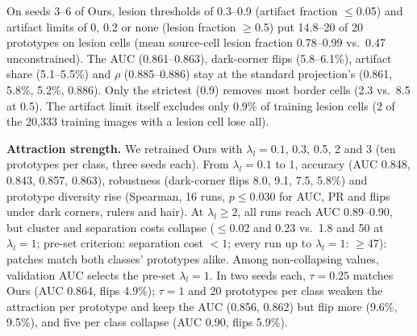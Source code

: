 \documentclass[conference]{IEEEtran}
\begin{document}
On seeds 3--6 of Ours, lesion thresholds of 0.3--0.9 (artifact fraction $\leq$0.05) and artifact limits of 0, 0.2 or none (lesion fraction $\geq$0.5) put 14.8--20 of 20 prototypes on lesion cells (mean source-cell lesion fraction 0.78--0.99 vs.\ 0.47 unconstrained). The AUC (0.861--0.863), dark-corner flips (5.8--6.1\%), artifact share (5.1--5.5\%) and $\rho$ (0.885--0.886) stay at the standard projection's (0.861, 5.8\%, 5.2\%, 0.886). Only the strictest (0.9) removes most border cells (2.3 vs.\ 8.5 at 0.5). The artifact limit itself excludes only 0.9\% of training lesion cells (2 of the 20{,}333 training images with a lesion cell lose all).

\textbf{Attraction strength.} We retrained Ours with $\lambda_l=0.1$, 0.3, 0.5, 2 and 3 (ten prototypes per class, three seeds each). From $\lambda_l=0.1$ to 1, accuracy (AUC 0.848, 0.843, 0.857, 0.863), robustness (dark-corner flips 8.0, 9.1, 7.5, 5.8\%) and prototype diversity rise (Spearman, 16 runs, $p\leq0.030$ for AUC, PR and flips under dark corners, rulers and hair). At $\lambda_l\geq2$, all runs reach AUC 0.89--0.90, but cluster and separation costs collapse ($\leq$0.02 and 0.23 vs.\ 1.8 and 50 at $\lambda_l=1$; pre-set criterion: separation cost $<1$; every run up to $\lambda_l=1$: $\geq$47): patches match both classes' prototypes alike. Among non-collapsing values, validation AUC selects the pre-set $\lambda_l=1$. In two seeds each, $\tau=0.25$ matches Ours (AUC 0.864, flips 4.9\%); $\tau=1$ and 20 prototypes per class weaken the attraction per prototype and keep the AUC (0.856, 0.862) but flip more (9.6\%, 9.5\%), and five per class collapse (AUC 0.90, flips 5.9\%).
\end{document}
